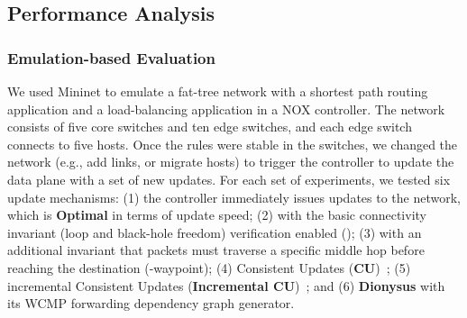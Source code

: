 \subsection{Performance Analysis}
\label{sec:parallel}

\subsubsection{Emulation-based Evaluation}

We used Mininet to emulate a fat-tree network with a shortest path routing application and a load-balancing application in a NOX controller. The network consists of five core switches
and ten edge switches, and each edge switch connects to five hosts. %
Once the rules were stable in the switches, we changed the network (e.g., add links, or migrate hosts) to trigger the controller to update the data plane with a set of new updates. %
For each set of experiments, we tested six update mechanisms: (1) the controller immediately issues updates to the network, which is \textbf{Optimal} in terms of update speed; (2) \textbf{\name} with the basic connectivity invariant (loop and black-hole freedom) verification enabled (\name); (3) \name with an additional invariant that packets must traverse a specific middle hop before reaching the destination (\name-waypoint); (4) Consistent Updates (\textbf{CU})~\cite{Reitblatt2012}; (5) incremental Consistent Updates (\textbf{Incremental CU})~\cite{incremental-cu}; and (6) \textbf{Dionysus} \cite{jin2014dynamic} with its WCMP forwarding dependency graph generator.


